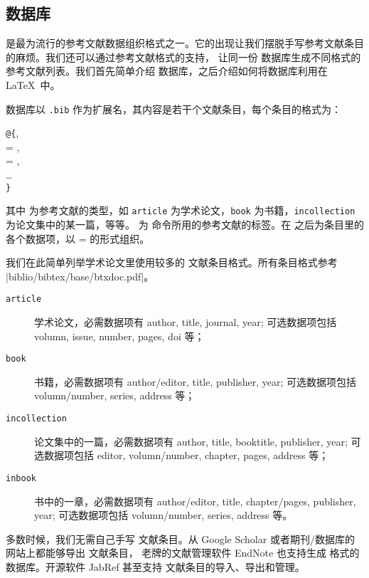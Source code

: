 \subsection{ 数据库}

 是最为流行的参考文献数据组织格式之一。它的出现让我们摆脱手写参考文献条目的麻烦。我们还可以通过参考文献格式的支持，
让同一份  数据库生成不同格式的参考文献列表。我们首先简单介绍  数据库，之后介绍如何将数据库利用在 \LaTeX\ 中。

 数据库以 \texttt{.bib} 作为扩展名，其内容是若干个文献条目，每个条目的格式为：
\begin{command}
\texttt @\texttt\{, \\
\qquad{} = , \\
\qquad{} = , \\
\qquad\ldots\\
\texttt\}
\end{command}

其中  为参考文献的类型，如 \texttt{article} 为学术论文，\texttt{book} 为书籍，\texttt{in\-collection} 为论文集中的某一篇，等等。
 为  命令所用的参考文献的标签。在  之后为条目里的各个数据项，以  =  的形式组织。

我们在此简单列举学术论文里使用较多的  文献条目格式。所有条目格式参考 \CTAN|biblio/bibtex/base/btxdoc.pdf|。
\begin{description}
  \item[\texttt{article}] 学术论文，必需数据项有 author, title, journal, year; 可选数据项包括 volumn, issue, number, pages, doi 等；
  \item[\texttt{book}] 书籍，必需数据项有 author/editor, title, publisher, year; 可选数据项包括 volumn/number, series, address 等；
  \item[\texttt{incollection}] 论文集中的一篇，必需数据项有 author, title, booktitle, publisher, year; 可选数据项包括 editor, volumn/number, chapter, pages, address 等；
  \item[\texttt{inbook}] 书中的一章，必需数据项有 author/editor, title, chapter/pages, publisher, year; 可选数据项包括 volumn/number, series, address 等。
\end{description}

多数时候，我们无需自己手写  文献条目。从 Google Scholar 或者期刊/数据库的网站上都能够导出  文献条目，
老牌的文献管理软件 EndNote 也支持生成  格式的数据库。开源软件 JabRef 甚至支持  文献条目的导入、导出和管理。

